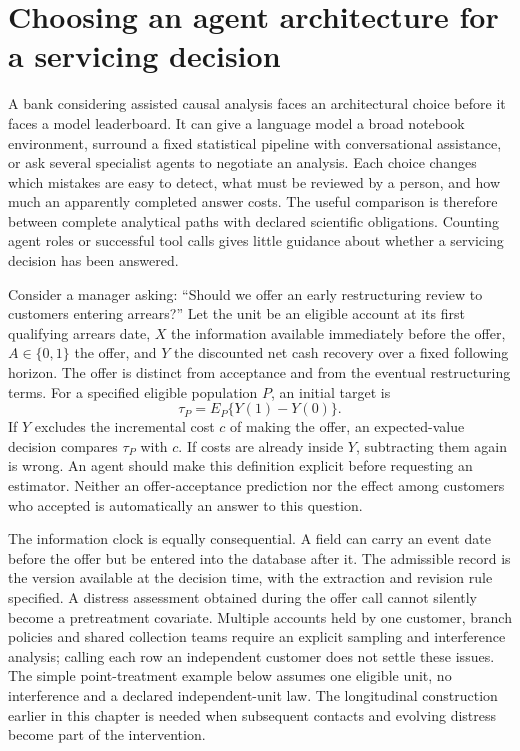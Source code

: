 \section{Choosing an agent architecture for a servicing decision}
\label{exec13:agent-architecture}

A bank considering assisted causal analysis faces an architectural choice
before it faces a model leaderboard. It can give a language model a broad
notebook environment, surround a fixed statistical pipeline with conversational
assistance, or ask several specialist agents to negotiate an analysis. Each
choice changes which mistakes are easy to detect, what must be reviewed by a
person, and how much an apparently completed answer costs. The useful comparison
is therefore between complete analytical paths with declared scientific
obligations. Counting agent roles or successful tool calls gives little guidance
about whether a servicing decision has been answered.

Consider a manager asking: ``Should we offer an early restructuring review to
customers entering arrears?'' Let the unit be an eligible account at its first
qualifying arrears date, $X$ the information available immediately before the
offer, $A\in\{0,1\}$ the offer, and $Y$ the discounted net cash recovery over a
fixed following horizon. The offer is distinct from acceptance and from the
eventual restructuring terms. For a specified eligible population $P$, an
initial target is
\begin{equation}
 \tau_P=E_P\{Y(1)-Y(0)\}.
 \label{exec13:architecture-target}
\end{equation}
If $Y$ excludes the incremental cost $c$ of making the offer, an expected-value
decision compares $\tau_P$ with $c$. If costs are already inside $Y$, subtracting
them again is wrong. An agent should make this definition explicit before
requesting an estimator. Neither an offer-acceptance prediction nor the effect
among customers who accepted is automatically an answer to this question.

The information clock is equally consequential. A field can carry an event
date before the offer but be entered into the database after it. The admissible
record is the version available at the decision time, with the extraction and
revision rule specified. A distress assessment obtained during the offer call
cannot silently become a pretreatment covariate. Multiple accounts held by one
customer, branch policies and shared collection teams require an explicit
sampling and interference analysis; calling each row an independent customer
does not settle these issues. The simple point-treatment example below assumes
one eligible unit, no interference and a declared independent-unit law. The
longitudinal construction earlier in this chapter is needed when subsequent
contacts and evolving distress become part of the intervention.


